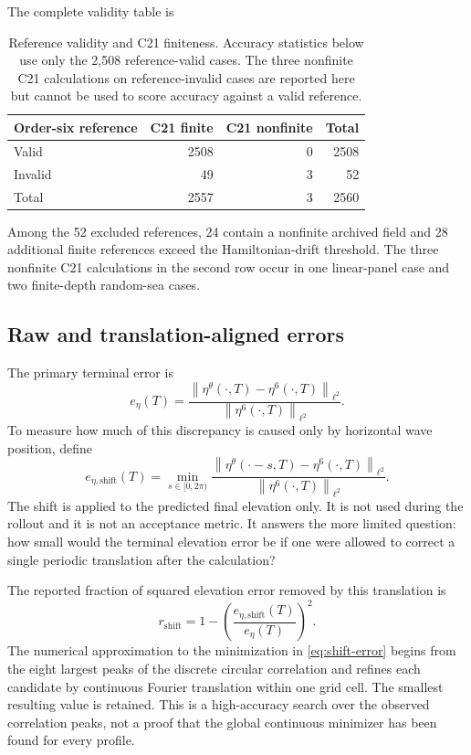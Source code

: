 \documentclass[11pt]{article}
\newcommand{\norm}[1]{\left\lVert #1\right\rVert}
\newcommand{\eref}{e_{\eta}}
\newcommand{\eshift}{e_{\eta,\mathrm{shift}}}
\begin{document}
The complete validity table is
\begin{table}[htbp]
\centering
\begin{tabular}{lrrr}
\toprule
Order-six reference & C21 finite & C21 nonfinite & Total \\
\midrule
Valid   & 2508 & 0 & 2508 \\
Invalid & 49   & 3 & 52 \\
\midrule
Total   & 2557 & 3 & 2560 \\
\bottomrule
\end{tabular}
\caption{Reference validity and C21 finiteness.  Accuracy statistics below use
only the 2,508 reference-valid cases.  The three nonfinite C21 calculations on
reference-invalid cases are reported here but cannot be used to score
accuracy against a valid reference.}
\label{tab:validity}
\end{table}
Among the 52 excluded references, 24 contain a nonfinite archived field and 28
additional finite references exceed the Hamiltonian-drift threshold.  The
three nonfinite C21 calculations in the second row occur in one linear-panel
case and two finite-depth random-sea cases.

\subsection{Raw and translation-aligned errors}

The primary terminal error is
\begin{equation}
  \eref(T)=
  \frac{\norm{\eta^\theta(\cdot,T)-\eta^6(\cdot,T)}_{\ell^2}}
       {\norm{\eta^6(\cdot,T)}_{\ell^2}}.
  \label{eq:raw-error}
\end{equation}
To measure how much of this discrepancy is caused only by horizontal wave
position, define
\begin{equation}
  \eshift(T)=\min_{s\in[0,2\pi)}
  \frac{\norm{\eta^\theta(\cdot-s,T)-\eta^6(\cdot,T)}_{\ell^2}}
       {\norm{\eta^6(\cdot,T)}_{\ell^2}}.
  \label{eq:shift-error}
\end{equation}
The shift is applied to the predicted final elevation only.  It is not used
during the rollout and it is not an acceptance metric.  It answers the more
limited question: how small would the terminal elevation error be if one were
allowed to correct a single periodic translation after the calculation?

The reported fraction of squared elevation error removed by this translation
is
\begin{equation}
  r_{\mathrm{shift}}
  =1-\left(\frac{\eshift(T)}{\eref(T)}\right)^2.
  \label{eq:rshift}
\end{equation}
The numerical approximation to the minimization in \eqref{eq:shift-error}
begins from the eight largest peaks of the discrete circular correlation and
refines each candidate by continuous Fourier translation within one grid
cell.  The smallest resulting value is retained.  This is a high-accuracy
search over the observed correlation peaks, not a proof that the global
continuous minimizer has been found for every profile.
\end{document}
